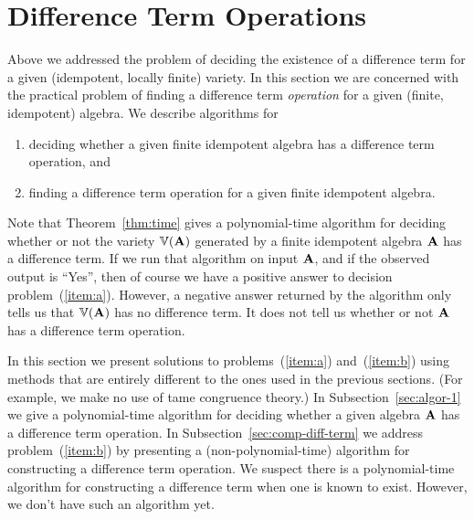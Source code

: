\section{Difference Term Operations}
Above we addressed the problem of deciding the existence of a difference term 
for a given (idempotent, locally finite) variety.  In this section we are 
concerned with the practical problem of finding a difference term 
\emph{operation} for a given (finite, idempotent) algebra.
We describe algorithms for
\begin{enumerate}
\item \label{item:a} deciding whether a given finite idempotent algebra 
has a difference term operation, and 
\item \label{item:b} finding a difference term operation 
for a given finite idempotent algebra.
\end{enumerate}
Note that Theorem~\ref{thm:time} gives a polynomial-time algorithm
for deciding whether or not the variety $\operatorname{\mathbb{V}}(\mathbf{A})$ generated by a 
finite idempotent algebra $\mathbf{A}$ has a difference term.
If we run that algorithm on input $\mathbf{A}$, and if the observed
output is ``Yes'', then of course we have a positive answer to decision 
problem~(\ref{item:a}).  However, a negative answer returned by the 
algorithm only tells us that $\operatorname{\mathbb{V}}(\mathbf{A})$ has no difference term.  
It does not tell us whether or not $\mathbf{A}$ has a difference term operation.

\medskip


\medskip

In this section we present solutions to problems~(\ref{item:a}) and~(\ref{item:b})
using methods that are entirely different to the ones used in the previous
sections. 
(For example, we make no use of tame congruence theory.)  
In Subsection~\ref{sec:algor-1} we give a polynomial-time algorithm
for deciding whether a given algebra $\mathbf{A}$ has a difference term operation.
In Subsection~\ref{sec:comp-diff-term} we address problem~(\ref{item:b})
by presenting a (non-polynomial-time) algorithm for constructing a difference term
operation.  
We suspect there is a polynomial-time algorithm for
constructing a difference term when one is known to exist.  However,
we don't have such an algorithm yet.


